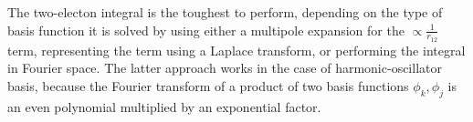 \documentclass[final,3p,times,twocolumn]{elsarticle}
\begin{document}
	The two-electon integral is the toughest to perform, depending on the type of basis function it is solved by using either a multipole expansion for the $\propto \frac{1}{r_{12}}$ term, representing the term using a Laplace transform, or performing the integral in Fourier space. The latter approach works in the case of harmonic-oscillator basis, because the Fourier transform of a product of two basis functions $\phi_k, \phi_j$ is an even polynomial multiplied by an exponential factor. 
	
	
	
	
	
	
	
	
\end{document}
